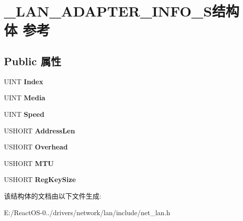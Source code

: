 \hypertarget{struct___l_a_n___a_d_a_p_t_e_r___i_n_f_o___s}{}\section{\+\_\+\+L\+A\+N\+\_\+\+A\+D\+A\+P\+T\+E\+R\+\_\+\+I\+N\+F\+O\+\_\+\+S结构体 参考}
\label{struct___l_a_n___a_d_a_p_t_e_r___i_n_f_o___s}
\subsection*{Public 属性}
\begin{DoxyCompactItemize}
\item 
\mbox{\label{struct___l_a_n___a_d_a_p_t_e_r___i_n_f_o___s_af05c74c5f55b2cfb1ff7d4b20a945022}} 
U\+I\+NT {\bfseries Index}
\item 
\mbox{\label{struct___l_a_n___a_d_a_p_t_e_r___i_n_f_o___s_abc28c05484ad4c1dcc1541a99d27c17c}} 
U\+I\+NT {\bfseries Media}
\item 
\mbox{\label{struct___l_a_n___a_d_a_p_t_e_r___i_n_f_o___s_afcc8f529bc4e72e1b987b964e2f14d79}} 
U\+I\+NT {\bfseries Speed}
\item 
\mbox{\label{struct___l_a_n___a_d_a_p_t_e_r___i_n_f_o___s_ae77f5d996c46882cbc7d90a5516b4fa1}} 
U\+S\+H\+O\+RT {\bfseries Address\+Len}
\item 
\mbox{\label{struct___l_a_n___a_d_a_p_t_e_r___i_n_f_o___s_aeec0ee58e775b56f80f76bf8d3f18838}} 
U\+S\+H\+O\+RT {\bfseries Overhead}
\item 
\mbox{\label{struct___l_a_n___a_d_a_p_t_e_r___i_n_f_o___s_a46841e94d783f2786cc7a982b5953250}} 
U\+S\+H\+O\+RT {\bfseries M\+TU}
\item 
\mbox{\label{struct___l_a_n___a_d_a_p_t_e_r___i_n_f_o___s_ab034c0707a50d6f8b3b5102e335d1518}} 
U\+S\+H\+O\+RT {\bfseries Reg\+Key\+Size}
\end{DoxyCompactItemize}


该结构体的文档由以下文件生成\+:\begin{DoxyCompactItemize}
\item 
E\+:/\+React\+O\+S-\/0../drivers/network/lan/include/net\+\_\+lan.\+h\end{DoxyCompactItemize}
